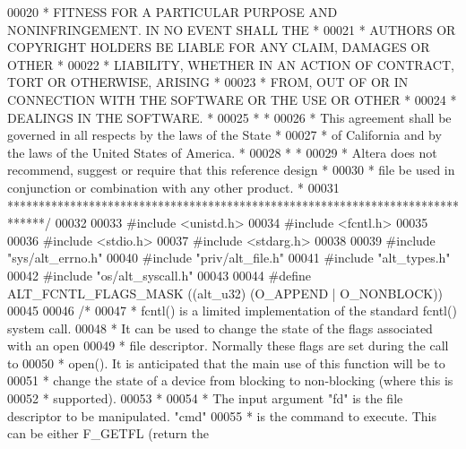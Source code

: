 \begin{DoxyCode}
00020 \textcolor{comment}{* FITNESS FOR A PARTICULAR PURPOSE AND NONINFRINGEMENT. IN NO EVENT SHALL THE *}
00021 \textcolor{comment}{* AUTHORS OR COPYRIGHT HOLDERS BE LIABLE FOR ANY CLAIM, DAMAGES OR OTHER      *}
00022 \textcolor{comment}{* LIABILITY, WHETHER IN AN ACTION OF CONTRACT, TORT OR OTHERWISE, ARISING     *}
00023 \textcolor{comment}{* FROM, OUT OF OR IN CONNECTION WITH THE SOFTWARE OR THE USE OR OTHER         *}
00024 \textcolor{comment}{* DEALINGS IN THE SOFTWARE.                                                   *}
00025 \textcolor{comment}{*                                                                             *}
00026 \textcolor{comment}{* This agreement shall be governed in all respects by the laws of the State   *}
00027 \textcolor{comment}{* of California and by the laws of the United States of America.              *}
00028 \textcolor{comment}{*                                                                             *}
00029 \textcolor{comment}{* Altera does not recommend, suggest or require that this reference design    *}
00030 \textcolor{comment}{* file be used in conjunction or combination with any other product.          *}
00031 \textcolor{comment}{******************************************************************************/}
00032 
00033 \textcolor{preprocessor}{#include <unistd.h>}
00034 \textcolor{preprocessor}{#include <fcntl.h>}
00035 
00036 \textcolor{preprocessor}{#include <stdio.h>}
00037 \textcolor{preprocessor}{#include <stdarg.h>}
00038 
00039 \textcolor{preprocessor}{#include "sys/alt_errno.h"}
00040 \textcolor{preprocessor}{#include "priv/alt_file.h"}
00041 \textcolor{preprocessor}{#include "alt_types.h"}
00042 \textcolor{preprocessor}{#include "os/alt_syscall.h"}
00043 
00044 \textcolor{preprocessor}{#define ALT\_FCNTL\_FLAGS\_MASK ((alt\_u32) (O\_APPEND | O\_NONBLOCK))}
00045 
00046 \textcolor{comment}{/*}
00047 \textcolor{comment}{ * fcntl() is a limited implementation of the standard fcntl() system call.}
00048 \textcolor{comment}{ * It can be used to change the state of the flags associated with an open}
00049 \textcolor{comment}{ * file descriptor. Normally these flags are set during the call to}
00050 \textcolor{comment}{ * open(). It is anticipated that the main use of this function will be to}
00051 \textcolor{comment}{ * change the state of a device from blocking to non-blocking (where this is}
00052 \textcolor{comment}{ * supported). }
00053 \textcolor{comment}{ *}
00054 \textcolor{comment}{ * The input argument "fd" is the file descriptor to be manipulated. "cmd"}
00055 \textcolor{comment}{ * is the command to execute. This can be either F\_GETFL (return the }

\end{DoxyCode}
